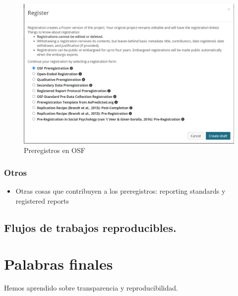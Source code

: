 \documentclass[
]{book}
\providecommand{\tightlist}{%
  \setlength{\itemsep}{0pt}\setlength{\parskip}{0pt}}
\begin{document}
\begin{figure}[H]

{\centering \includegraphics[width=1\linewidth]{docs/images/osfprereg3} 

}

\caption{Preregistros en OSF}\label{fig:osfprereg3}
\end{figure}

\hypertarget{otros}{%
\subsection{Otros}\label{otros}}

\begin{itemize}
\tightlist
\item
  Otras cosas que contribuyen a los preregistros: reporting standards y registered reports
\end{itemize}

\hypertarget{flujos-de-trabajos-reproducibles.}{%
\section{Flujos de trabajos reproducibles.}\label{flujos-de-trabajos-reproducibles.}}

\hypertarget{palabras-finales}{%
\chapter{Palabras finales}\label{palabras-finales}}

Hemos aprendido sobre transparencia y reproducibilidad.

  
\end{document}
